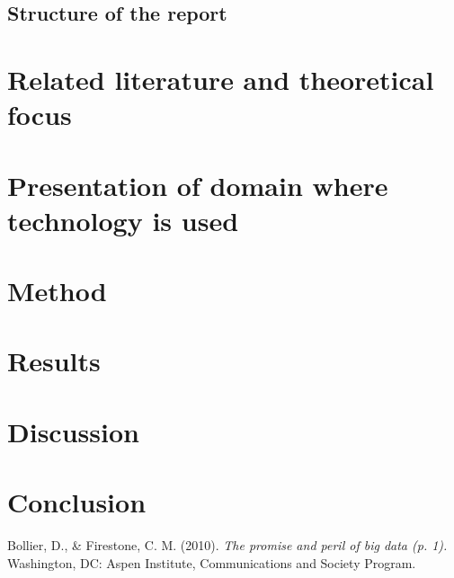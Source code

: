 \documentclass[a4paper,english]{report}
\begin{document}
		\section{Structure of the report}
	\chapter{Related literature and theoretical focus}
	\chapter{Presentation of domain where technology is used}
	\chapter{Method}
	\chapter{Results}
	\chapter{Discussion}
	\chapter{Conclusion}
	\begin{thebibliography}{1}
		
		Bollier, D., \& Firestone, C. M. (2010). \emph{The promise and peril of big data (p. 1).} Washington, DC: Aspen Institute, Communications and Society Program.
	\end{thebibliography}
\end{document}
